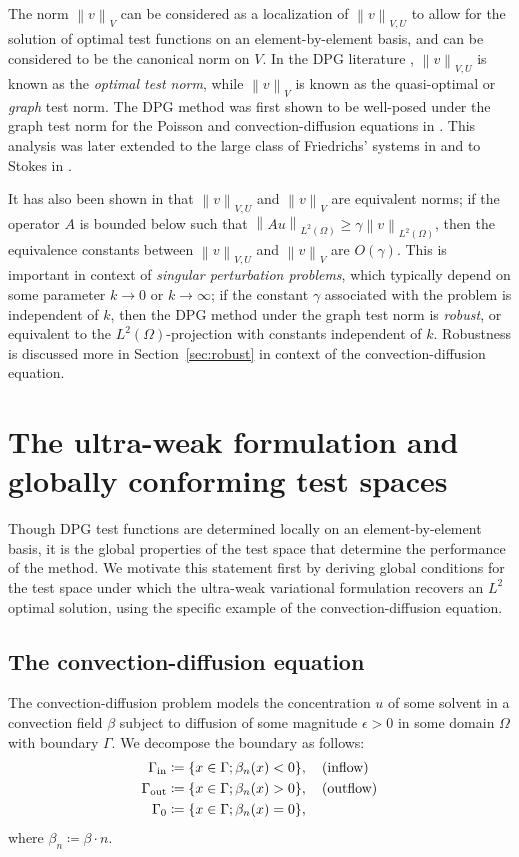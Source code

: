 \documentclass[11pt,onecolumn]{scrartcl}
\newcommand{\nor}[1]{\left\| #1 \right\|}
\newcommand{\LRp}[1]{\left( #1 \right)}
\renewcommand{\L}{L^2\LRp{\Omega}}
\begin{document}
The norm $\nor{v}_V$ can be considered as a localization of $\nor{v}_{V,U}$ to allow for the solution of optimal test functions on an element-by-element basis, and can be considered to be the canonical norm on $V$.  In the DPG literature \cite{DPG4}, $\nor{v}_{V,U}$ is known as the {\em optimal test norm}, while $\nor{v}_{V}$ is known as the quasi-optimal or {\em graph} test norm.  The DPG method was first shown to be well-posed under the graph test norm for the Poisson and convection-diffusion equations in \cite{analysisDPG}.  This analysis was later extended to the large class of Friedrichs' systems in \cite{Bui-ThanhDemkowiczGhattas11b} and to Stokes in \cite{stokesDPG}.  

It has also been shown in \cite{stokesDPG} that $\nor{v}_{V,U}$ and $\nor{v}_V$ are equivalent norms; if the operator $A$ is bounded below such that $\nor{Au}_{\L} \geq \gamma\nor{v}_{\L}$, then the equivalence constants between $\nor{v}_{V,U}$ and $\nor{v}_V$ are $O(\gamma)$.  This is important in context of \textit{singular perturbation problems}, which typically depend on some parameter $k\rightarrow 0$ or $k\rightarrow \infty$; if the constant $\gamma$ associated with the problem is independent of $k$, then the DPG method under the graph test norm is \textit{robust}, or equivalent to the $\L$-projection with constants independent of $k$.  Robustness is discussed more in Section~\ref{sec:robust} in context of the convection-diffusion equation.

\section{The ultra-weak formulation and globally conforming test spaces}

Though DPG test functions are determined locally on an element-by-element basis, it is the global properties of the test space that determine the performance of the method.  We motivate this statement first by deriving global conditions for the test space under which the ultra-weak variational formulation recovers an $L^2$ optimal solution, using the specific example of the convection-diffusion equation.  

\subsection{The convection-diffusion equation}

The convection-diffusion problem models the concentration $u$ of some solvent in a convection field $\beta$ subject to diffusion of some magnitude $\epsilon > 0$ in some domain $\Omega$ with boundary $\Gamma$.  We decompose the boundary as follows:
\begin{align*}
\Gamma_{\rm in} &\coloneqq \{x\in \Gamma; \beta_n(x) < 0\}, \quad {\rm
(inflow)}\\ 
\Gamma_{\rm out} &\coloneqq \{x\in \Gamma; \beta_n(x) > 0\},
\quad {\rm (outflow)}\\
\Gamma_{0} &\coloneqq \{x\in \Gamma;\beta_n(x) = 0\},
\end{align*}
where $\beta_n \coloneqq \beta \cdot n$.
\end{document}
